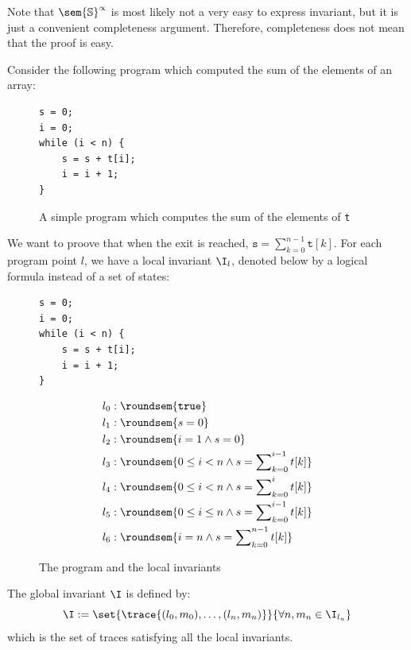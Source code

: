 \documentclass[toc]{../cs-classes/cs-classes}
\begin{document}
Note that $\sem{\S}^\propto$ is most likely not a very easy to express invariant, but it is just a convenient completeness argument. Therefore, completeness does not mean that the proof is easy.

\begin{example}
    Consider the following program which computed the sum of the elements of an array:
    \begin{figure}[!ht]
        \centering 
        \begin{minipage}{0.2\textwidth}
            \begin{verbatim}
s = 0;
i = 0;
while (i < n) {
    s = s + t[i];
    i = i + 1;
}
            \end{verbatim}
        \end{minipage}
        \caption{A simple program which computes the sum of the elements of \texttt{t}}
    \end{figure}
    We want to proove that when the exit is reached, $\texttt{s} = \sum_{k=0}^{n-1}\texttt{t}[k]$. For each program point $l$, we have a local invariant $\I_l$, denoted below by a logical formula instead of a set of states:
    \begin{figure}[!ht]
        \centering
        \begin{minipage}{0.2\textwidth}
            \baselineskip
            \centering
            \begin{verbatim}
s = 0;
i = 0;
while (i < n) {
    s = s + t[i];
    i = i + 1;
}
            \end{verbatim}
        \end{minipage}
        \begin{minipage}{.5\textwidth}
          \begin{equation*}
            \begin{aligned}
                l_0 &: \roundsem{\texttt{true}} \\
                l_1 &: \roundsem{s=0} \\
                l_2 &: \roundsem{i=1 \land s=0} \\
                l_3 &: \roundsem{0\leq i<n \land s = \sum\nolimits_{k=0}^{i-1}t[k]} \\
                l_4 &: \roundsem{0\leq i<n \land s = \sum\nolimits_{k=0}^i t[k]} \\
                l_5 &: \roundsem{0\leq i\leq n \land s = \sum\nolimits_{k=0}^{i-1}t[k]} \\
                l_6 &: \roundsem{i=n \land s = \sum\nolimits_{k=0}^{n-1}t[k]}
            \end{aligned}
          \end{equation*}
        \end{minipage}
        \caption{The program and the local invariants}
    \end{figure}

    The global invariant $\I$ is defined by:
    \begin{equation*}
        \I := \set{\trace{(l_0, m_0), \dots, (l_n, m_n)}}{\forall n, m_n\in \I_{l_n}}
    \end{equation*}
    which is the set of traces satisfying all the local invariants.
\end{example}
\end{document}
